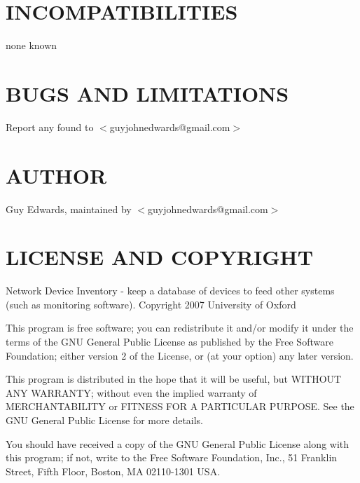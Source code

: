 \documentclass{book}
\begin{document}
\section{INCOMPATIBILITIES}
\label{_INCOMPATIBILITIES}
\hypertarget{_INCOMPATIBILITIES}{}



none known


\section{BUGS AND LIMITATIONS}
\label{_BUGS_AND_LIMITATIONS}
\hypertarget{_BUGS_AND_LIMITATIONS}{}



Report any found to $<$guyjohnedwards@gmail.com$>$


\section{AUTHOR}
\label{_AUTHOR}
\hypertarget{_AUTHOR}{}



Guy Edwards, maintained by $<$guyjohnedwards@gmail.com$>$


\section{LICENSE AND COPYRIGHT}
\label{_LICENSE_AND_COPYRIGHT}
\hypertarget{_LICENSE_AND_COPYRIGHT}{}



Network Device Inventory - keep a database of devices to feed other systems (such as monitoring software). Copyright 2007 University of Oxford



This program is free software; you can redistribute it and/or modify it under the terms of the GNU General Public License as published by the Free Software Foundation; either version 2 of the License, or (at your option) any later version.



This program is distributed in the hope that it will be useful, but WITHOUT ANY WARRANTY; without even the implied warranty of MERCHANTABILITY or FITNESS FOR A PARTICULAR PURPOSE. See the GNU General Public License for more details.



You should have received a copy of the GNU General Public License along with this program; if not, write to the Free Software Foundation, Inc., 51 Franklin Street, Fifth Floor, Boston, MA 02110-1301 USA.
\end{document}
